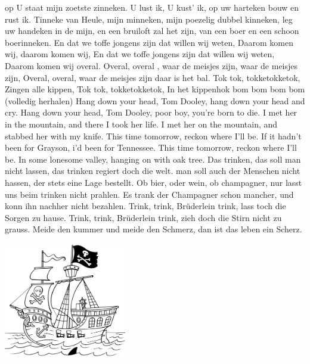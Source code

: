 \documentclass{article}
\begin{document}
\begin{songs}{}
op U staat mijn zoetste zinneken.
U lust ik, U kust’ ik, 
op uw harteken bouw en rust ik.
Tinneke van Heule, mijn minneken,
mijn poezelig dubbel kinneken,
leg uw handeken in de mijn, en een bruiloft zal het zijn,
van een boer en een schoon boerinneken.
\endverse
\endsong 
{}
\beginverse*
En dat we toffe jongens zijn dat willen wij weten,
Daarom komen wij, daarom komen wij,
En dat we toffe jongens zijn dat willen wij weten,
Daarom komen wij overal. 
Overal, overal , waar de meisjes zijn, waar de meisjes zijn,
Overal, overal, waar de meisjes zijn daar is het bal. 
\endverse
\endsong 
{}
\beginverse*
Tok tok, tokketokketok,
Zingen alle kippen,
Tok tok, tokketokketok,
In het kippenhok bom bom bom bom (volledig herhalen)
\endverse
\endsong 
{}
\beginchorus
Hang down your head, Tom Dooley,
hang down your head and cry.
Hang down your head, Tom Dooley,
poor boy, you’re born to die.
\endchorus
\beginverse*
I met her in the mountain,
and there I took her life.
I met her on the mountain,
and stabbed her with my knife.
\endverse
\beginverse*
This time tomorrow,
reckon where I’ll be.
If it hadn’t been for Grayson,
i’d been for Tennessee.
\endverse
\beginverse*
This time tomorrow,
reckon where I’ll be.
In some lonesome valley,
hanging on with oak tree.
\endverse
\endsong 
{}
\beginverse*
Das trinken, das soll man nicht lassen,
das trinken regiert doch die welt.
man soll auch der Menschen nicht hassen,
der stets eine Lage bestellt.
Ob bier, oder wein, ob champagner,
nur lasst uns beim trinken nicht prahlen.
Es trank der Champagner schon mancher,
und konn ihn nachher nicht bezahlen.
\endverse
\beginverse*
Trink, trink, Brüderlein trink,
lass toch die Sorgen zu hause.
Trink, trink, Brüderlein trink,
zieh doch die Stirn nicht zu grauss.
Meide den kummer und meide den Schmerz,
dan ist das leben ein Scherz.
\endverse
\endsong 
\begin{intersong}
    \includegraphics[width=0.4\textwidth]{triomfantelijkliedvandezilvervloot}

\end{intersong}
\end{songs}
\end{document}
